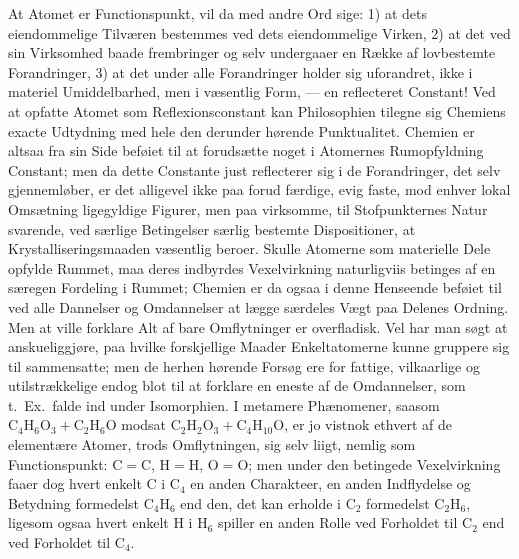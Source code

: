 \documentclass[12pt,a4paper]{book}
\begin{document}
At Atomet er Functionspunkt, vil da med andre Ord
sige: 1) at dets eiendommelige Tilværen bestemmes ved dets
eiendommelige Virken, 2) at det ved sin Virksomhed baade
frembringer og selv undergaaer en Række af lovbestemte
Forandringer, 3) at det under alle Forandringer holder sig
uforandret, ikke i materiel Umiddelbarhed, men i væsentlig Form,
--- en reflecteret Constant! Ved at opfatte Atomet som
Reflexionsconstant kan Philosophien tilegne sig Chemiens exacte
Udtydning med hele den derunder hørende Punktualitet. Chemien
er altsaa fra sin Side beføiet til at forudsætte noget i
Atomernes Rumopfyldning Constant; men da dette Constante
just reflecterer sig i de Forandringer, det selv gjennemløber,
er det alligevel ikke paa forud færdige, evig faste, mod
enhver lokal Omsætning ligegyldige Figurer, men paa
virksomme, til Stofpunkternes Natur svarende, ved særlige
Betingelser særlig bestemte Dispositioner, at
Krystalliseringsmaaden væsentlig beroer. Skulle Atomerne som materielle
Dele opfylde Rummet, maa deres indbyrdes Vexelvirkning
naturligviis betinges af en særegen Fordeling i Rummet;
Chemien er da ogsaa i denne Henseende beføiet til ved alle
Dannelser og Omdannelser at lægge særdeles Vægt paa
Delenes Ordning. Men at ville forklare Alt af bare
Omflytninger er overfladisk. Vel har man søgt at anskueliggjøre,
paa hvilke forskjellige Maader Enkeltatomerne kunne gruppere
sig til sammensatte; men de herhen hørende Forsøg ere for
fattige, vilkaarlige og utilstrækkelige endog blot til at forklare
en eneste af de Omdannelser, som t.~Ex.\ falde ind under
Isomorphien. I metamere Phænomener, saasom
$\mathrm{C}_4\mathrm{H}_6\mathrm{O}_3 + \mathrm{C}_2\mathrm{H}_6\mathrm{O}$
modsat
$\mathrm{C}_2\mathrm{H}_2\mathrm{O}_3 + \mathrm{C}_4\mathrm{H}_{10}\mathrm{O}$,
er jo vistnok ethvert af
de elementære Atomer, trods Omflytningen, sig selv liigt,
\setcounter{footnote}{0}
nemlig som Functionspunkt: $\mathrm{C} = \mathrm{C}$,
$\mathrm{H} = \mathrm{H}$, $\mathrm{O} = \mathrm{O}$;
men under den betingede Vexelvirkning faaer dog hvert
enkelt $\mathrm{C}$ i $\mathrm{C}_4$ en anden Charakteer, en anden
Indflydelse og Betydning formedelst $\mathrm{C}_4\mathrm{H}_6$
end den, det kan erholde i $\mathrm{C}_2$ formedelst
$\mathrm{C}_2\mathrm{H}_6$, ligesom ogsaa hvert enkelt
$\mathrm{H}$ i $\mathrm{H}_6$ spiller en anden Rolle ved
Forholdet til $\mathrm{C}_2$ end ved Forholdet til $\mathrm{C}_4$.
\end{document}
